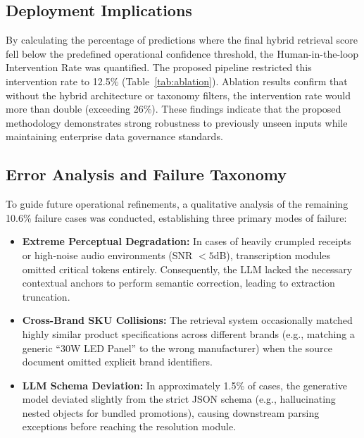 \subsection{Deployment Implications}
By calculating the percentage of predictions where the final hybrid retrieval score fell below the predefined operational confidence threshold, the Human-in-the-loop Intervention Rate was quantified. The proposed pipeline restricted this intervention rate to 12.5\% (Table~\ref{tab:ablation}). Ablation results confirm that without the hybrid architecture or taxonomy filters, the intervention rate would more than double (exceeding 26\%). These findings indicate that the proposed methodology demonstrates strong robustness to previously unseen inputs while maintaining enterprise data governance standards.

\subsection{Error Analysis and Failure Taxonomy}
To guide future operational refinements, a qualitative analysis of the remaining 10.6\% failure cases was conducted, establishing three primary modes of failure:
\begin{itemize}
    \item \textbf{Extreme Perceptual Degradation:} In cases of heavily crumpled receipts or high-noise audio environments (SNR $< 5$dB), transcription modules omitted critical tokens entirely. Consequently, the LLM lacked the necessary contextual anchors to perform semantic correction, leading to extraction truncation.
    \item \textbf{Cross-Brand SKU Collisions:} The retrieval system occasionally matched highly similar product specifications across different brands (e.g., matching a generic ``30W LED Panel'' to the wrong manufacturer) when the source document omitted explicit brand identifiers.
    \item \textbf{LLM Schema Deviation:} In approximately 1.5\% of cases, the generative model deviated slightly from the strict JSON schema (e.g., hallucinating nested objects for bundled promotions), causing downstream parsing exceptions before reaching the resolution module.
\end{itemize}